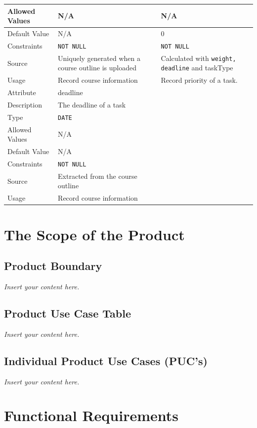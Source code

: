 \documentclass[12pt]{article}
\newcommand{\lips}{\textit{Insert your content here.}}
\begin{document}
\begin{longtable}[H]{ |p{3cm}|p{5cm}|p{5cm}|  }
\hline
Allowed Values &N/A &N/A\\
\hline
Default Value &N/A &0\\
\hline
Constraints & \texttt{NOT NULL}&\texttt{NOT NULL}\\
\hline
Source & Uniquely generated when a course outline is uploaded&Calculated with \texttt{weight, deadline} and taskType\\
\hline
Usage & Record course information & Record priority of a task.\\
\hline
Attribute & deadline&\\
\hline
Description & The deadline of a task & \\
\hline
Type & \texttt{DATE}&\\
\hline
Allowed Values &N/A &\\
\hline
Default Value &N/A &\\
\hline
Constraints & \texttt{NOT NULL}&\\
\hline
Source & Extracted from the course outline&\\
\hline
Usage & Record course information & \\
\hline
\end{longtable}


\section{The Scope of the Product}
\subsection{Product Boundary}
\lips
\subsection{Product Use Case Table}
\lips
\subsection{Individual Product Use Cases (PUC's)}
\lips

\section{Functional Requirements}
\end{document}
